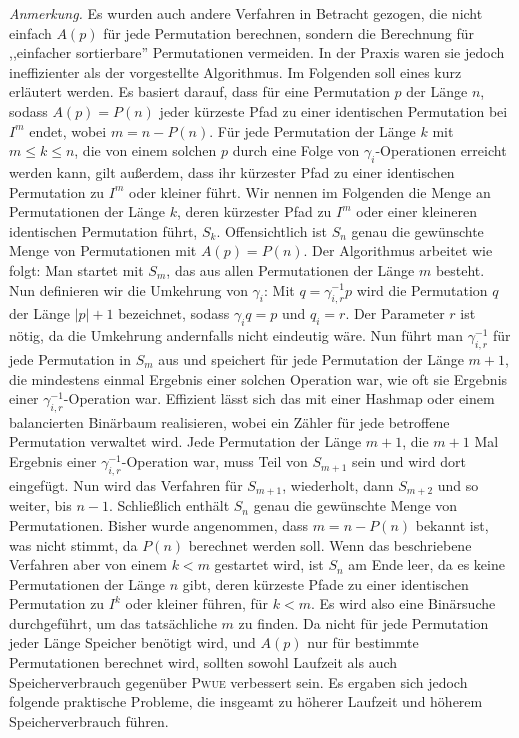 \documentclass[a4paper, 10pt, ngerman]{article}
\begin{document}
\medskip
\emph{Anmerkung.} Es wurden auch andere Verfahren in Betracht gezogen, die nicht einfach $A(p)$ für jede Permutation berechnen, sondern die Berechnung für ,,einfacher sortierbare'' Permutationen vermeiden. In der Praxis waren sie jedoch ineffizienter als der vorgestellte Algorithmus. Im Folgenden soll eines kurz erläutert werden. Es basiert darauf, dass für eine Permutation $p$ der Länge $n$, sodass $A(p) = P(n)$ jeder kürzeste Pfad zu einer identischen Permutation bei $I^{m}$ endet, wobei $m = n - P(n)$. Für jede Permutation der Länge $k$ mit $m \le k \le n$, die von einem solchen $p$ durch eine Folge von $\gamma_i$-Operationen erreicht werden kann, gilt außerdem, dass ihr kürzester Pfad zu einer identischen Permutation zu $I^m$ oder kleiner führt. Wir nennen im Folgenden die Menge an Permutationen der Länge $k$, deren kürzester Pfad zu $I^m$ oder einer kleineren identischen Permutation führt, $S_k$. Offensichtlich ist $S_n$ genau die gewünschte Menge von Permutationen mit $A(p) = P(n)$. Der Algorithmus arbeitet wie folgt: Man startet mit $S_m$, das aus allen Permutationen der Länge $m$ besteht. Nun definieren wir die Umkehrung von $\gamma_i$: Mit $q = \gamma_{i, r}^{-1} p$ wird die Permutation $q$ der Länge $|p| + 1$ bezeichnet, sodass $\gamma_i q = p$ und $q_i = r$. Der Parameter $r$ ist nötig, da die Umkehrung andernfalls nicht eindeutig wäre. Nun führt man $\gamma_{i, r}^{-1}$ für jede Permutation in $S_m$ aus und speichert für jede Permutation der Länge $m + 1$, die mindestens einmal Ergebnis einer solchen Operation war, wie oft sie Ergebnis einer $\gamma_{i, r}^{-1}$-Operation war. Effizient lässt sich das mit einer Hashmap oder einem balancierten Binärbaum realisieren, wobei ein Zähler für jede betroffene Permutation verwaltet wird. Jede Permutation der Länge $m+ 1$, die $m + 1$ Mal Ergebnis einer $\gamma_{i, r}^{-1}$-Operation war, muss Teil von $S_{m + 1}$ sein und wird dort eingefügt. Nun wird das Verfahren für $S_{m+ 1}$, wiederholt, dann $S_{m + 2}$ und so weiter, bis $n - 1$. Schließlich enthält $S_n$ genau die gewünschte Menge von Permutationen. Bisher wurde angenommen, dass $m = n - P(n)$ bekannt ist, was nicht stimmt, da $P(n)$ berechnet werden soll. Wenn das beschriebene Verfahren aber von einem $k < m$ gestartet wird, ist $S_n$ am Ende leer, da es keine Permutationen der Länge $n$ gibt, deren kürzeste Pfade zu einer identischen Permutation zu $I^k$ oder kleiner führen, für $k < m$. Es wird also eine Binärsuche durchgeführt, um das tatsächliche $m$ zu finden. Da nicht für jede Permutation jeder Länge Speicher benötigt wird, und $A(p)$ nur für bestimmte Permutationen berechnet wird, sollten sowohl Laufzeit als auch Speicherverbrauch gegenüber \textsc{Pwue} verbessert sein. Es ergaben sich jedoch folgende praktische Probleme, die insgeamt zu höherer Laufzeit und höherem Speicherverbrauch führen.
\end{document}
